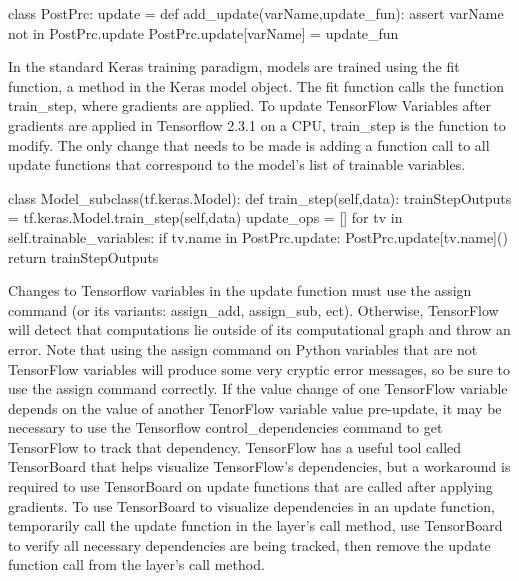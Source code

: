 \begin{code}
class PostPrc:
    update = {}
    def add_update(varName,update_fun):
        assert varName not in PostPrc.update
        PostPrc.update[varName] = update_fun
\end{code}


In the standard Keras training paradigm, models are trained using the fit function, a method in the Keras model object. The fit function calls the function train\_step, where gradients are applied.  To update TensorFlow Variables after gradients are applied in Tensorflow 2.3.1 on a CPU, train\_step is the function to modify. The only change that needs to be made is adding a function call to all update functions that correspond to the model's list of trainable variables.

\begin{code}
class Model_subclass(tf.keras.Model):
    def train_step(self,data):
        trainStepOutputs = tf.keras.Model.train_step(self,data)
        update_ops = []
        for tv in self.trainable_variables:
            if tv.name in PostPrc.update:
                PostPrc.update[tv.name]()
        return trainStepOutputs
\end{code}

Changes to Tensorflow variables in the update function must use the assign command (or its variants: assign\_add, assign\_sub, ect). Otherwise, TensorFlow will detect that computations lie outside of its computational graph and throw an error. Note that using the assign command on Python variables that are not TensorFlow variables will produce some very cryptic error messages, so be sure to use the assign command correctly. If the value change of one TensorFlow variable depends on the value of another TenorFlow variable value pre-update, it may be necessary to use the Tensorflow control\_dependencies command to get TensorFlow to track that dependency. TensorFlow has a useful tool called TensorBoard that helps visualize TensorFlow's dependencies, but a workaround is required to use TensorBoard on update functions that are called after applying gradients. To use TensorBoard to visualize dependencies in an update function, temporarily call the update function in the layer's call method, use TensorBoard to verify all necessary dependencies are being tracked, then remove the update function call from the layer's call method.


